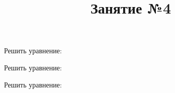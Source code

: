 \begin{listofex}
	\item Решить уравнение:
	\begin{enumcols}[itemcolumns=2]
		\item {}
		\item {}
		\item {}
		\item {}
	\end{enumcols}
	\item Решить уравнение:
	\begin{enumcols}[itemcolumns=2]
		\item {}
		\item {}
		\item {}
		\item {}
		\item {}
	\end{enumcols}
	\item Решить уравнение:
	\begin{enumcols}[itemcolumns=2]
		\item {}
		\item {}
		\item {}
		\item {}
		\item {}
		\item {}
		\item {}
	\end{enumcols}
\end{listofex}
\newpage
\title{Занятие №4}
